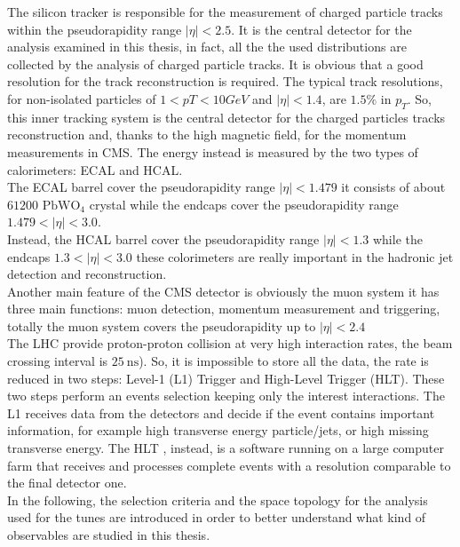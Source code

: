\noindent The silicon tracker is responsible for the measurement of charged particle tracks within the pseudorapidity
range $|\eta| < 2.5$. It is the central detector for the analysis examined in this thesis, in fact, all the the used distributions are collected by the analysis of charged particle tracks. It is obvious that a good resolution for the track reconstruction is required. The typical track resolutions, for non-isolated particles of $1 < pT < 10 GeV$ and $|\eta| < 1.4$, are $1.5\%$ in $p_T$. So, this inner tracking system is the central detector for the charged particles tracks reconstruction and, thanks to the high magnetic field, for the momentum measurements in CMS. The energy instead is measured by the two types of calorimeters: ECAL and HCAL.
\\   
The ECAL barrel cover the pseudorapidity range $|\eta|<1.479$ it consists of about $61200$ $\mathrm{PbWO}_4$ crystal while the endcaps cover the pseudorapidity range $1.479<|\eta|<3.0$. 
\\
Instead, the HCAL barrel cover the pseudorapidity range $|\eta|<1.3$ while the endcaps $1.3<|\eta|<3.0$ these colorimeters are really important in the hadronic jet detection and reconstruction. 
\\
Another main feature of the CMS detector is obviously the muon system it has three main functions: muon detection, momentum measurement and triggering, totally the muon system covers the pseudorapidity up to $|\eta|<2.4$
\\
The LHC provide proton-proton collision at very high interaction rates, the beam crossing interval is $25\ \mathrm{ns}$). So, it is impossible to store all the data, the rate is reduced in two steps: Level-1 (L1) Trigger and High-Level Trigger (HLT).
These two steps perform an events selection keeping only the interest interactions.
The L1 receives data from the detectors and decide if the event contains important information, for example high transverse energy particle/jets, or high missing transverse energy.
The HLT , instead, is a software running on a large computer farm that receives and processes complete events with a resolution comparable to the final detector one.
\\
In the following, the selection criteria and the space topology for the analysis used for the tunes are introduced in order to better understand what kind of observables are studied in this thesis.

